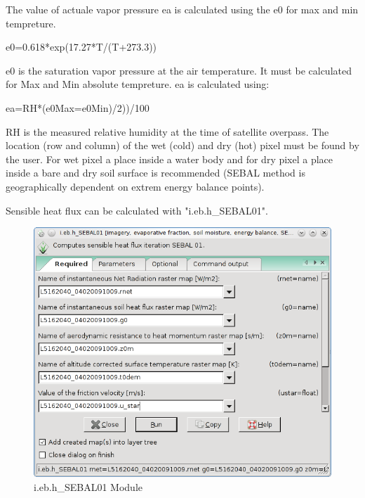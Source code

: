 The value of actuale vapor pressure ea is calculated using the e0 for max and min tempreture.\newline
\begin{smallverbatim}
    e0=0.618*exp(17.27*T/(T+273.3))  
\end{smallverbatim}
e0 is the saturation vapor pressure at the air temperature. It must be calculated for Max and Min absolute tempreture.\newline
ea is calculated using:\newline
\begin{smallverbatim}
    ea=RH*(e0Max=e0Min)/2))/100  
\end{smallverbatim}
RH is the measured relative humidity at the time of satellite overpass.\newline
The location (row and column) of the wet (cold) and dry (hot) pixel must be found by the user. For wet pixel a place inside a water body and for dry pixel a place inside a bare and dry soil surface is recommended (SEBAL method is geographically dependent on extrem energy balance points).\newline


Sensible heat flux can be calculated with "i.eb.h\_SEBAL01".\newline

\begin{figure}[htbp]
   \centering
   \includegraphics[scale=0.4]{gipe027.png}
   \caption{i.eb.h\_SEBAL01 Module}
   \label{fig:gipe027}
\end{figure}

